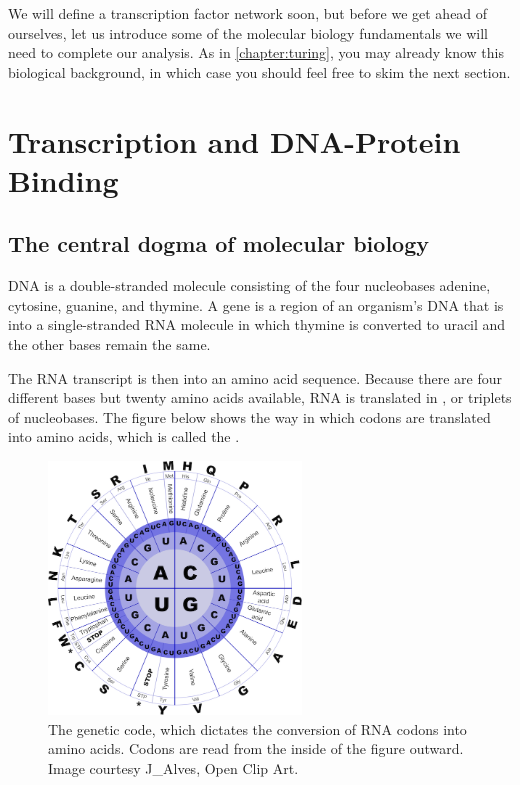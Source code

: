 We will define a transcription factor network soon, but before we get ahead of ourselves, let us introduce some of the molecular biology fundamentals we will need to complete our analysis. As in \autoref{chapter:turing}, you may already know this biological background, in which case you should feel free to skim the next section.

\FloatBarrier
{}

\section{Transcription and DNA-Protein Binding}
\label{sec:transcription_and_dna-protein_binding}

\subsection{The central dogma of molecular biology}

DNA is a double-stranded molecule consisting of the four nucleobases adenine, cytosine, guanine, and thymine. A gene is a region of an organism's DNA that is  into a single-stranded RNA molecule in which thymine is converted to uracil and the other bases remain the same.

The RNA transcript is then  into an amino acid sequence. Because there are four different bases but twenty amino acids available, RNA is translated in , or triplets of nucleobases. The figure below shows the way in which codons are translated into amino acids, which is called the .

\begin{figure}[h]
\centering
\mySfFamily
\includegraphics[width = 0.6\textwidth]{../images/genetic_code.png}
\caption{The genetic code, which dictates the conversion of RNA codons into amino acids. Codons are read from the inside of the figure outward. Image courtesy J_Alves, Open Clip Art.}
\label{fig:genetic_code}
\end{figure}

